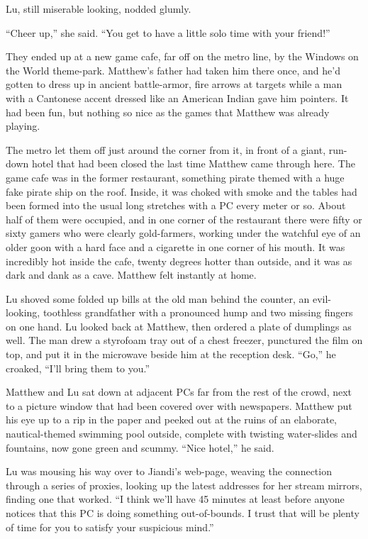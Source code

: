 Lu, still miserable looking, nodded glumly.

``Cheer up,'' she said. ``You get to have a little solo time with your
friend!''

They ended up at a new game cafe, far off on the metro line, by the
Windows on the World theme-park. Matthew's father had taken him
there once, and he'd gotten to dress up in ancient battle-armor,
fire arrows at targets while a man with a Cantonese accent dressed
like an American Indian gave him pointers. It had been fun, but
nothing so nice as the games that Matthew was already playing.

The metro let them off just around the corner from it, in front of
a giant, run-down hotel that had been closed the last time Matthew
came through here. The game cafe was in the former restaurant,
something pirate themed with a huge fake pirate ship on the roof.
Inside, it was choked with smoke and the tables had been formed
into the usual long stretches with a PC every meter or so. About
half of them were occupied, and in one corner of the restaurant
there were fifty or sixty gamers who were clearly gold-farmers,
working under the watchful eye of an older goon with a hard face
and a cigarette in one corner of his mouth. It was incredibly hot
inside the cafe, twenty degrees hotter than outside, and it was as
dark and dank as a cave. Matthew felt instantly at home.

Lu shoved some folded up bills at the old man behind the counter,
an evil-looking, toothless grandfather with a pronounced hump and
two missing fingers on one hand. Lu looked back at Matthew, then
ordered a plate of dumplings as well. The man drew a styrofoam tray
out of a chest freezer, punctured the film on top, and put it in
the microwave beside him at the reception desk. ``Go,'' he croaked,
``I'll bring them to you.''

Matthew and Lu sat down at adjacent PCs far from the rest of the
crowd, next to a picture window that had been covered over with
newspapers. Matthew put his eye up to a rip in the paper and peeked
out at the ruins of an elaborate, nautical-themed swimming pool
outside, complete with twisting water-slides and fountains, now
gone green and scummy. ``Nice hotel,'' he said.

Lu was mousing his way over to Jiandi's web-page, weaving the
connection through a series of proxies, looking up the latest
addresses for her stream mirrors, finding one that worked. ``I think
we'll have 45 minutes at least before anyone notices that this PC
is doing something out-of-bounds. I trust that will be plenty of
time for you to satisfy your suspicious mind.''

